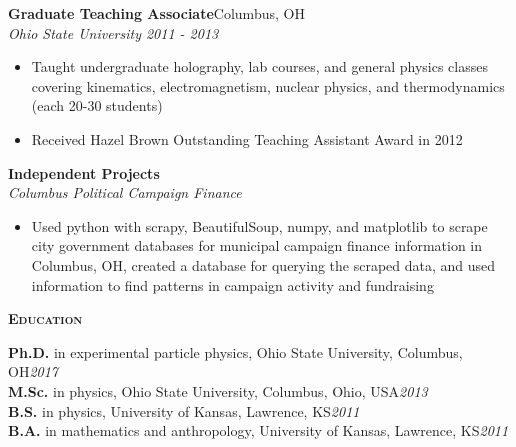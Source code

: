 \documentclass[line]{letter}
\begin{document}
\begin{addmargin}[1em]{1em}
{\large {\bf Graduate Teaching Associate}\hfill Columbus, OH\vspace{1mm}}\\
{\large \it Ohio State University \hfill 2011 - 2013} \\
\vspace{-7mm}
\begin{itemize}[leftmargin=5mm]
\item Taught undergraduate holography, lab courses, and general physics classes covering kinematics, electromagnetism, nuclear physics, and thermodynamics (each 20-30 students)
\item Received Hazel Brown Outstanding Teaching Assistant Award in 2012
\end{itemize}

{\large {\bf Independent Projects}\vspace{1mm}}\\
{\large \it Columbus Political Campaign Finance} \\
\vspace{-7mm}
\begin{itemize}[leftmargin=5mm]
\item Used python with scrapy, BeautifulSoup, numpy, and matplotlib to scrape city government databases for municipal campaign finance information in Columbus, OH, created a database for querying the scraped data, and used information to find patterns in campaign activity and fundraising 
\end{itemize}
\end{addmargin}


{\vspace{10pt}\Large \textsc{\textbf{Education}}}%
\begin{addmargin}[1em]{1em}
{\bf \large Ph.D.} in experimental particle physics, Ohio State University, Columbus, OH\hfill {\large \it 2017}\vspace{1mm}\\
{\bf \large M.Sc.} in physics, Ohio State University, Columbus, Ohio, USA\hfill {\large \it 2013}\vspace{1mm}\\
{\bf \large B.S.} in physics, University of Kansas, Lawrence, KS\hfill {\large \it 2011}\vspace{1mm}\\
{\bf \large B.A.} in mathematics and anthropology,  University of Kansas, Lawrence, KS\hfill {\large \it 2011}
\end{addmargin}
\end{document}
